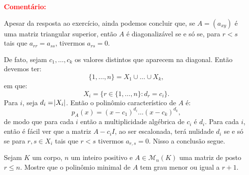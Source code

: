 \documentclass[11pt,a4paper]{article}
\begin{document}
\bigskip
\noindent
\textbf{\textcolor{Red}{Comentário:}}

\medskip
\noindent
Apesar da resposta ao exercício, ainda podemos concluir que, se $A=(a_{xy})$ é uma matriz triangular superior, então $A$ é diagonalizável se e só se, para $r<s$ tais que $a_{rr}=a_{ss}$, tivermos $a_{rs}=0$.

\medskip
\noindent
De fato, sejam $c_1,\dots,c_k$ os valores distintos que aparecem na diagonal. Então devemos ter:
\[
\{1,\dots,n\}=X_1\cup\dots\cup X_k,
\]
em que:
\[
X_i=\{r\in\{1,\dots,n\}:d_r=c_i\}.
\]
Para $i$, seja $d_i=\abs{X_i}$. Então o polinômio característico de $A$ é:
\[
p_A(x)=(x-c_1)^{d_i}\dots(x-c_k)^{d_k},
\]
de modo que para cada $i$ então a multiplicidade algébrica de $c_i$ é $d_i$. Para cada $i$, então é fácil ver que a matriz $A-c_iI$, ao ser escalonada, terá nulidade $d_i$ se e só se para $r,s\in X_i$ tais que $r<s$ tivermos $a_{r,s}=0$. Nisso a conclusão segue.

 Sejam $K$ um corpo, $n$ um inteiro positivo e $A \in \mathcal{M}_n(K)$ uma matriz de posto $r \le n.$ Mostre que o polinômio minimal de $A$ tem grau menor ou igual a $r + 1.$ 

\end{document}
